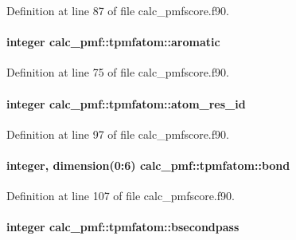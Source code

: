 Definition at line 87 of file calc\-\_\-pmfscore.\-f90.

\hypertarget{structcalc__pmf_1_1tpmfatom_a23ac509e4e8510f7660bb981fe71ccf5}{
\paragraph[{aromatic}]{\setlength{\rightskip}{0pt plus 5cm}integer calc\-\_\-pmf\-::tpmfatom\-::aromatic}}\label{structcalc__pmf_1_1tpmfatom_a23ac509e4e8510f7660bb981fe71ccf5}


Definition at line 75 of file calc\-\_\-pmfscore.\-f90.

\hypertarget{structcalc__pmf_1_1tpmfatom_a0a324d62ed3dcb36e29212bd8d68d9fe}{
\paragraph[{atom\-\_\-res\-\_\-id}]{\setlength{\rightskip}{0pt plus 5cm}integer calc\-\_\-pmf\-::tpmfatom\-::atom\-\_\-res\-\_\-id}}\label{structcalc__pmf_1_1tpmfatom_a0a324d62ed3dcb36e29212bd8d68d9fe}


Definition at line 97 of file calc\-\_\-pmfscore.\-f90.

\hypertarget{structcalc__pmf_1_1tpmfatom_a0dae5e79b033be6969f2ccd66489456e}{
\paragraph[{bond}]{\setlength{\rightskip}{0pt plus 5cm}integer, dimension(0\-:6) calc\-\_\-pmf\-::tpmfatom\-::bond}}\label{structcalc__pmf_1_1tpmfatom_a0dae5e79b033be6969f2ccd66489456e}


Definition at line 107 of file calc\-\_\-pmfscore.\-f90.

\hypertarget{structcalc__pmf_1_1tpmfatom_a39689a003047821a24d619c1525cc9c4}{
\paragraph[{bsecondpass}]{\setlength{\rightskip}{0pt plus 5cm}integer calc\-\_\-pmf\-::tpmfatom\-::bsecondpass}}\label{structcalc__pmf_1_1tpmfatom_a39689a003047821a24d619c1525cc9c4}


